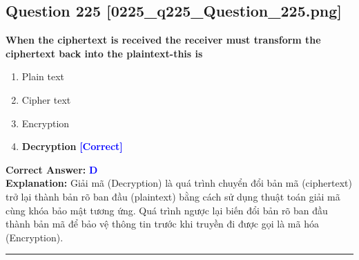 \documentclass[11pt,a4paper]{article}
\begin{document}
\begin{minipage}{\textwidth}
\subsection*{Question 225 \quad \footnotesize{[0225\_q225\_Question\_225.png]}}
\noindent \textbf{When the ciphertext is received the receiver must transform the ciphertext back into the plaintext-this is}

\begin{enumerate}[label=\Alph*.]
    \item Plain text
    \item Cipher text
    \item Encryption
    \item \textbf{Decryption} \hfill \textcolor{blue}{\textbf{[Correct]}}
\end{enumerate}

\noindent \textbf{Correct Answer:} \textcolor{blue}{\textbf{D}} \\[2pt]
\noindent \textbf{Explanation:} Giải mã (Decryption) là quá trình chuyển đổi bản mã (ciphertext) trở lại thành bản rõ ban đầu (plaintext) bằng cách sử dụng thuật toán giải mã cùng khóa bảo mật tương ứng. Quá trình ngược lại biến đổi bản rõ ban đầu thành bản mã để bảo vệ thông tin trước khi truyền đi được gọi là mã hóa (Encryption).

\par\vspace{0.3cm}
\hrule
\vspace{0.3cm}
\end{minipage}
\end{document}

